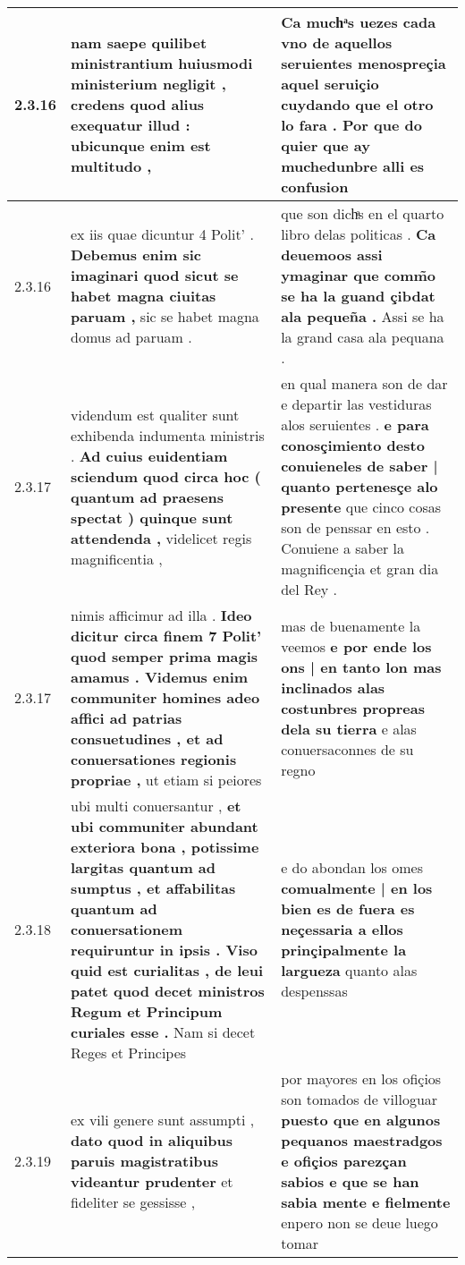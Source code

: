 \begin{tabular}{|p{1cm}|p{6.5cm}|p{6.5cm}|}
2.3.16 & nam saepe quilibet ministrantium huiusmodi ministerium negligit , \textbf{ credens quod alius exequatur illud : } ubicunque enim est multitudo , & Ca muchͣs uezes cada vno de aquellos seruientes menospreçia aquel seruiçio cuydando \textbf{ que el otro lo fara . } Por que do quier que ay muchedunbre alli es confusion \\\hline
2.3.16 & ex iis quae dicuntur 4 Polit’ . \textbf{ Debemus enim sic imaginari quod sicut se habet magna ciuitas paruam , } sic se habet magna domus ad paruam . & que son dichͣs en el quarto libro delas politicas . \textbf{ Ca deuemoos assi ymaginar que comm̃o se ha la guand çibdat ala pequeña . } Assi se ha la grand casa ala pequana . \\\hline
2.3.17 & videndum est qualiter sunt exhibenda indumenta ministris . \textbf{ Ad cuius euidentiam sciendum quod circa hoc ( quantum ad praesens spectat ) quinque sunt attendenda , } videlicet regis magnificentia , & en qual manera son de dar e departir las vestiduras alos seruientes . \textbf{ e para conosçimiento desto conuieneles de saber | quanto pertenesçe alo presente } que cinco cosas son de penssar en esto . Conuiene a saber la magnificençia et gran dia del Rey . \\\hline
2.3.17 & nimis afficimur ad illa . \textbf{ Ideo dicitur circa finem 7 Polit’ quod semper prima magis amamus . Videmus enim communiter homines adeo affici ad patrias consuetudines , et ad conuersationes regionis propriae , } ut etiam si peiores & mas de buenamente la veemos \textbf{ e por ende los ons | en tanto lon mas inclinados alas costunbres propreas dela su tierra } e alas conuersaconnes de su regno \\\hline
2.3.18 & ubi multi conuersantur , \textbf{ et ubi communiter abundant exteriora bona , potissime largitas quantum ad sumptus , et affabilitas quantum ad conuersationem requiruntur in ipsis . Viso quid est curialitas , de leui patet quod decet ministros Regum et Principum curiales esse . } Nam si decet Reges et Principes & e do abondan los omes \textbf{ comualmente | en los bien es de fuera es neçessaria a ellos prinçipalmente la largueza } quanto alas despenssas \\\hline
2.3.19 & ex vili genere sunt assumpti , \textbf{ dato quod in aliquibus paruis magistratibus videantur prudenter } et fideliter se gessisse , & por mayores en los ofiçios son tomados de villoguar \textbf{ puesto que en algunos pequanos maestradgos e ofiçios parezçan sabios e que se han sabia mente e fielmente } enpero non se deue luego tomar \\\hline

\end{tabular}
